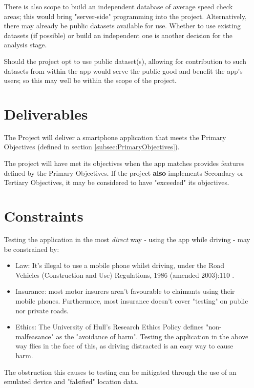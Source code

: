 \documentclass[11pt, a4paper, notitlepage]{report}
\begin{document}
There is also scope to build an independent database of average speed check 
areas; this would bring "server-side" programming into the project. 
Alternatively, there may already be public datasets available for use. Whether 
to use existing datasets (if possible) or build an independent one is another 
decision for the analysis stage. 

Should the project opt to use public dataset(s), allowing for contribution to 
such datasets from within the app would serve the public good and benefit the 
app's users; so this may well be within the scope of the project.

\section{Deliverables}
The Project will deliver a smartphone application that meets the Primary 
Objectives (defined in section \ref{subsec:PrimaryObjectives}).

The project will have met its objectives when the app matches provides features 
defined by the Primary Objectives. If the project \textbf{also} implements 
Secondary or Tertiary Objectives, it may be considered to have "exceeded" its 
objectives.

\section{Constraints}\label{sec:Constraints}
Testing the application in the most \textit{direct} way - using the app while 
driving - may be constrained by:
\begin{itemize}
    \item Law: It's illegal to use a mobile phone whilst driving, under the 
    Road Vehicles (Construction and Use) Regulations, 1986 (amended 2003):110 
    \citep{RoadVehiclesSI}.
    \item Insurance: most motor insurers aren't favourable to claimants using 
	their mobile phones. Furthermore, most insurance doesn't cover "testing" on 
	public nor private roads.
    \item Ethics: The University of Hull's Research Ethics Policy 
    \citep{HullEthicsPolicy} defines "non-malfeasance" as the "avoidance of 
    harm". Testing the application in the above way flies in the face of this, 
    as driving distracted is an easy way to cause harm.
\end{itemize}
The obstruction this causes to testing can be mitigated through the use of an 
emulated device and "falsified" location data.
\end{document}
